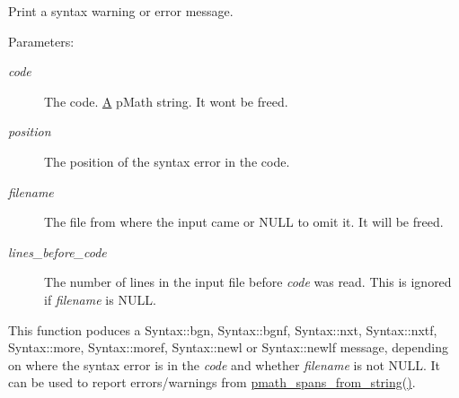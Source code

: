 Print a syntax warning or error message. 

\begin{Desc}
\item[Parameters:]
\begin{description}
\item[{\em code}]The code. \hyperlink{class_a}{A} pMath string. It wont be freed. \item[{\em position}]The position of the syntax error in the code. \item[{\em filename}]The file from where the input came or NULL to omit it. It will be freed. \item[{\em lines\_\-before\_\-code}]The number of lines in the input file before {\em code\/} was read. This is ignored if {\em filename\/} is NULL.\end{description}
\end{Desc}
This function poduces a Syntax::bgn, Syntax::bgnf, Syntax::nxt, Syntax::nxtf, Syntax::more, Syntax::moref, Syntax::newl or Syntax::newlf message, depending on where the syntax error is in the {\em code\/} and whether {\em filename\/} is not NULL. It can be used to report errors/warnings from \hyperlink{group__parser_g877ac507e27c8791a265105f796f3cef}{pmath\_\-spans\_\-from\_\-string()}. 